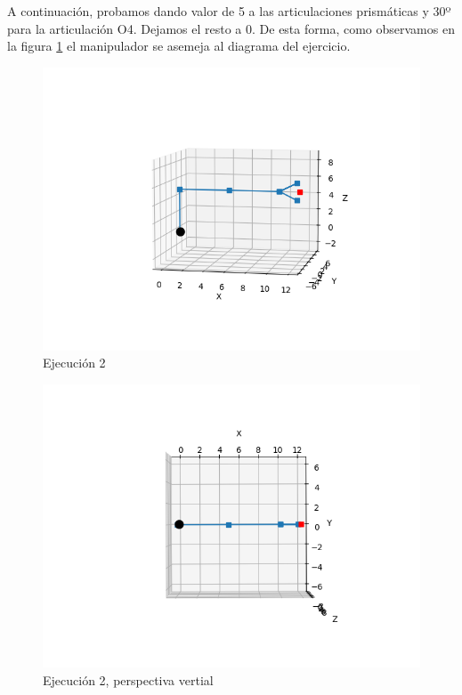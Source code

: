 A continuación, probamos dando valor de 5 a las articulaciones prismáticas y 30º para la articulación O4. Dejamos el resto a 0. De esta forma, como observamos en la figura \ref{chapter:ejecucion2a} el manipulador se asemeja al diagrama del ejercicio.
\begin{figure}[htb]
   \centering
   \includegraphics[width=0.8\linewidth]{images/cin_dir_5.png}
   \caption{Ejecución 2}
   \label{chapter:ejecucion2a}
\end{figure}
\begin{figure}[htb]
   \centering
   \includegraphics[width=0.8\linewidth]{images/cin_dir_6.png}
   \caption{Ejecución 2, perspectiva vertial}
   \label{chapter:ejecucion2b}
\end{figure}

